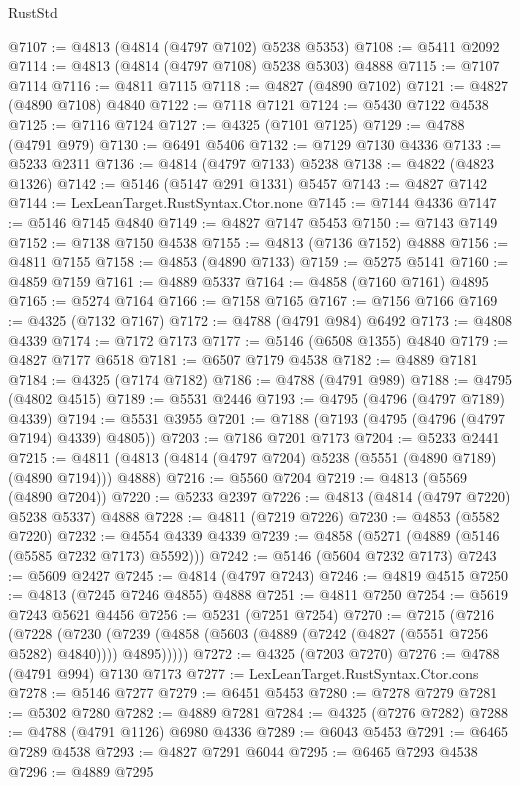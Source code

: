 \begin{lexlean}{RustStd}
\begin{coremodule}
@7107 := @4813 (@4814 (@4797 @7102) @5238 @5353)
@7108 := @5411 @2092
@7114 := @4813 (@4814 (@4797 @7108) @5238 @5303) @4888
@7115 := @7107 @7114
@7116 := @4811 @7115
@7118 := @4827 (@4890 @7102)
@7121 := @4827 (@4890 @7108) @4840
@7122 := @7118 @7121
@7124 := @5430 @7122 @4538
@7125 := @7116 @7124
@7127 := @4325 (@7101 @7125)
@7129 := @4788 (@4791 @979)
@7130 := @6491 @5406
@7132 := @7129 @7130 @4336
@7133 := @5233 @2311
@7136 := @4814 (@4797 @7133) @5238
@7138 := @4822 (@4823 @1326)
@7142 := @5146 (@5147 @291 @1331) @5457
@7143 := @4827 @7142
@7144 := LexLeanTarget.RustSyntax.Ctor.none
@7145 := @7144 @4336
@7147 := @5146 @7145 @4840
@7149 := @4827 @7147 @5453
@7150 := @7143 @7149
@7152 := @7138 @7150 @4538
@7155 := @4813 (@7136 @7152) @4888
@7156 := @4811 @7155
@7158 := @4853 (@4890 @7133)
@7159 := @5275 @5141
@7160 := @4859 @7159
@7161 := @4889 @5337
@7164 := @4858 (@7160 @7161) @4895
@7165 := @5274 @7164
@7166 := @7158 @7165
@7167 := @7156 @7166
@7169 := @4325 (@7132 @7167)
@7172 := @4788 (@4791 @984) @6492
@7173 := @4808 @4339
@7174 := @7172 @7173
@7177 := @5146 (@6508 @1355) @4840
@7179 := @4827 @7177 @6518
@7181 := @6507 @7179 @4538
@7182 := @4889 @7181
@7184 := @4325 (@7174 @7182)
@7186 := @4788 (@4791 @989)
@7188 := @4795 (@4802 @4515)
@7189 := @5531 @2446
@7193 := @4795 (@4796 (@4797 @7189) @4339)
@7194 := @5531 @3955
@7201 := @7188 (@7193 (@4795 (@4796 (@4797 @7194) @4339) @4805))
@7203 := @7186 @7201 @7173
@7204 := @5233 @2441
@7215 := @4811 (@4813 (@4814 (@4797 @7204) @5238 (@5551 (@4890 @7189) (@4890 @7194))) @4888)
@7216 := @5560 @7204
@7219 := @4813 (@5569 (@4890 @7204))
@7220 := @5233 @2397
@7226 := @4813 (@4814 (@4797 @7220) @5238 @5337) @4888
@7228 := @4811 (@7219 @7226)
@7230 := @4853 (@5582 @7220)
@7232 := @4554 @4339 @4339
@7239 := @4858 (@5271 (@4889 (@5146 (@5585 @7232 @7173) @5592)))
@7242 := @5146 (@5604 @7232 @7173)
@7243 := @5609 @2427
@7245 := @4814 (@4797 @7243)
@7246 := @4819 @4515
@7250 := @4813 (@7245 @7246 @4855) @4888
@7251 := @4811 @7250
@7254 := @5619 @7243 @5621 @4456
@7256 := @5231 (@7251 @7254)
@7270 := @7215
    (@7216
      (@7228
        (@7230 (@7239 (@4858 (@5603 (@4889 (@7242 (@4827 (@5551 @7256 @5282) @4840)))) @4895)))))
@7272 := @4325 (@7203 @7270)
@7276 := @4788 (@4791 @994) @7130 @7173
@7277 := LexLeanTarget.RustSyntax.Ctor.cons
@7278 := @5146 @7277
@7279 := @6451 @5453
@7280 := @7278 @7279
@7281 := @5302 @7280
@7282 := @4889 @7281
@7284 := @4325 (@7276 @7282)
@7288 := @4788 (@4791 @1126) @6980 @4336
@7289 := @6043 @5453
@7291 := @6465 @7289 @4538
@7293 := @4827 @7291 @6044
@7295 := @6465 @7293 @4538
@7296 := @4889 @7295

\end{coremodule}
\end{lexlean}
